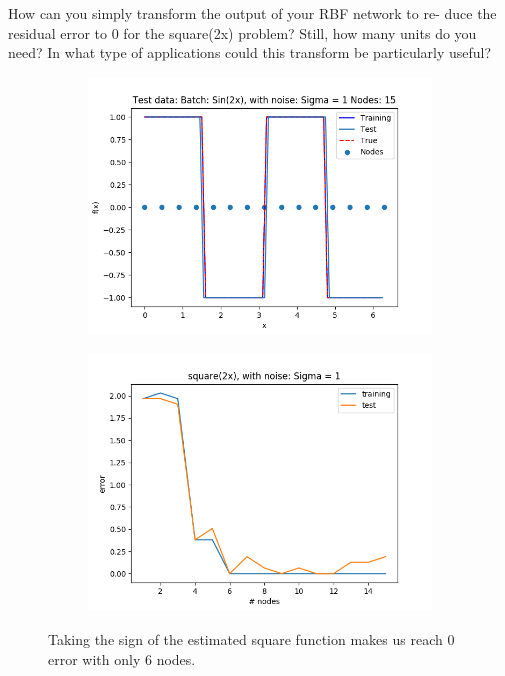 \documentclass{article}
\begin{document}
How can you simply transform the output of your RBF network to re- duce the residual error to 0 for the square(2x) problem? Still, how many units do you need? In what type of applications could this transform be particularly useful?

\begin{figure}[ht!]
    \centering
    \begin{subfigure}[t]{0.4\textwidth}
        \centering
        \includegraphics[width=1\textwidth]{plots/batch/best_square_cheat.png}
        \caption{}
    \end{subfigure}
    \begin{subfigure}[t]{0.4\textwidth}
        \centering
        \includegraphics[width=1\textwidth]{plots/batch/square_error_sign}
        \caption{}
    \end{subfigure}
    \caption{Taking the sign of the estimated square function makes us reach 0 error with only 6 nodes.}
\end{figure}
\end{document}

